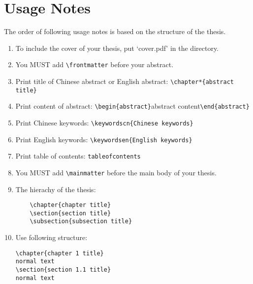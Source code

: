 \documentclass{bjfuthesis}
\begin{document}
\chapter{Usage Notes}
The order of following usage notes is based on the structure of the thesis.
\begin{enumerate}
\item To include the cover of your thesis, put `cover.pdf' in the directory.
\item You MUST add \verb|\frontmatter| before your abstract.
\item Print title of Chinese abstract or English abstract: \verb|\chapter*{abstract title}|
\item Print content of abstract: \verb|\begin{abstract}|abstract content\verb|\end{abstract}|
\item Print Chinese keywords: \verb|\keywordscn{Chinese keywords}|
\item Print English keywords: \verb|\keywordsen{English keywords}|
\item Print table of contents: \verb|tableofcontents|
\item You MUST add \verb|\mainmatter| before the main body of your thesis.
\item The hierachy of the thesis: 
\begin{verbatim}
	\chapter{chapter title}
	\section{section title}
	\subsection{subsection title}
\end{verbatim}
\item Use following structure:
\begin{verbatim}
\chapter{chapter 1 title}
normal text
\section{section 1.1 title}
normal text

\end{verbatim}
\end{enumerate}
\end{document}
